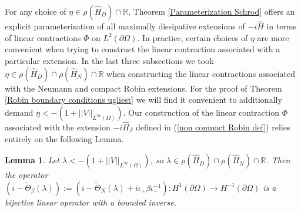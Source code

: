 \documentclass{article}
\numberwithin{equation}{section}
\newtheorem{lemma}{Lemma}[section]
\begin{document}
For any choice of $\eta \in \rho(\hat{H}_D)\cap\mathbb{R}$, Theorem \ref{Parameterization Schrod} offers an explicit parameterization of all maximally dissipative extensions of $-i\hat{H}$ in terms of linear contractions $\Phi$ on $L^2(\partial \Omega)$. In practice, certain choices of $\eta$ are more convenient when trying to construct the linear contraction associated with a particular extension. In the last three subsections we took $\eta \in \rho(\hat{H}_D)\cap \rho(\hat{H}_N)\cap \mathbb{R}$ when constructing the linear contractions associated with the Neumann and compact Robin extensions. For the proof of Theorem \ref{Robin boundary conditions ugliest} we will find it convenient to additionally demand $\eta < -(1+||V||_{L^\infty(\Omega)})$. Our construction of the linear contraction $\Phi$ associated with the extension $-i\hat{H}_\beta$ defined in (\ref{non compact Robin def}) relies entirely on the following Lemma.
\begin{lemma}\label{Theta beta invertibility}
    Let $\lambda <-(1+||V||_{L^\infty(\Omega)})$, so $\lambda \in \rho(\hat{H}_D)\cap \rho(\hat{H}_N)\cap \mathbb{R}$. Then the operator $(i - \tilde{\Theta}_\beta(\lambda)):=(i-\tilde{\Theta}_N(\lambda) + i \iota_+ \beta \iota_-^{-1}):H^{1}(\partial \Omega)\to H^{-1}(\partial \Omega)$ is a bijective linear operator with a bounded inverse.
\end{lemma}
\end{document}
